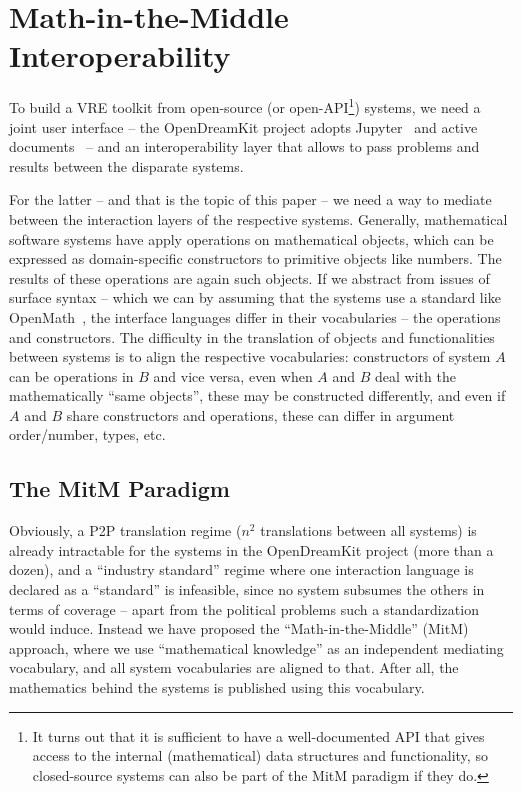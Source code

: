 \section{Math-in-the-Middle Interoperability}\label{sec:mitm}

To build a VRE toolkit from open-source (or open-API\footnote{It turns out that it is
  sufficient to have a well-documented API that gives access to the internal
  (mathematical) data structures and functionality, so closed-source systems can also be
  part of the MitM paradigm if they do.}) systems, we need a joint user interface -- the
OpenDreamKit project adopts Jupyter~\cite{jupyter-project:on} and active
documents~\cite{KohDavGin:psewads11} -- and an interoperability layer that allows to pass
problems and results between the disparate systems. 

For the latter -- and that is the topic of this paper -- we need a way to mediate between
the interaction layers of the respective systems. Generally, mathematical software systems
have apply operations on mathematical objects, which can be expressed as domain-specific
constructors to primitive objects like numbers. The results of these operations are again
such objects. If we abstract from issues of surface syntax -- which we can by assuming
that the systems use a standard like OpenMath~\cite{BusCapCar:2oms04}, the interface
languages differ in their vocabularies -- the operations and constructors. The difficulty
in the translation of objects and functionalities between systems is to align the
respective vocabularies: constructors of system $A$ can be operations in $B$ and vice
versa, even when $A$ and $B$ deal with the mathematically ``same objects'', these may be
constructed differently, and even if $A$ and $B$ share constructors and operations, these
can differ in argument order/number, types, etc.

\subsection{The MitM Paradigm}\label{sec:mitm:recap}

Obviously, a P2P translation regime ($n^2$ translations between all systems) is already
intractable for the systems in the OpenDreamKit project (more than a dozen), and a
``industry standard'' regime where one interaction language is declared as a ``standard''
is infeasible, since no system subsumes the others in terms of coverage -- apart from the
political problems such a standardization would induce. Instead we have proposed the
``Math-in-the-Middle'' (MitM) approach, where we use ``mathematical knowledge'' as an
independent mediating vocabulary, and all system vocabularies are aligned to that. After
all, the mathematics behind the systems is published using this vocabulary.

